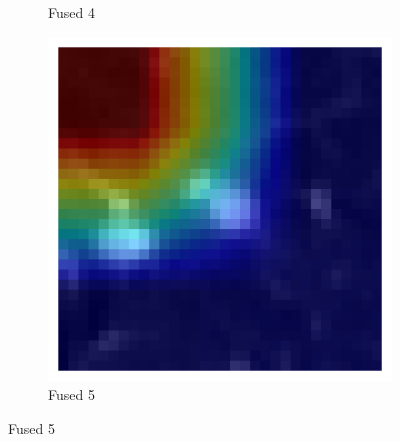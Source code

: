 \begin{figure}[htbp]
\begin{subfigure}[b]{0.18\textwidth}
        \caption*{Fused 4}
    \end{subfigure}
    \begin{subfigure}[b]{0.18\textwidth}
        \centering
        \includegraphics[width=\linewidth]{figures/heatmaps/ex5/sample_gradcam.png}
        \caption*{Fused 5}
    \end{subfigure}

    \vspace{2mm}


\end{figure}

